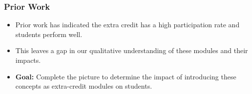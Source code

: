 \documentclass{beamer}
\begin{document}
\begin{frame}
    \frametitle{Prior Work}

    \begin{itemize}
      \item Prior work has indicated the extra credit has a high participation rate and students perform well. \\ \vspace{0.25cm}
      \item This leaves a gap in our qualitative understanding of these modules and their impacts. \\ \vspace{0.25cm}
      \item \textbf{Goal:} Complete the picture to determine the impact of introducing these concepts as extra-credit modules on students.
    \end{itemize}
\end{frame}
\end{document}

